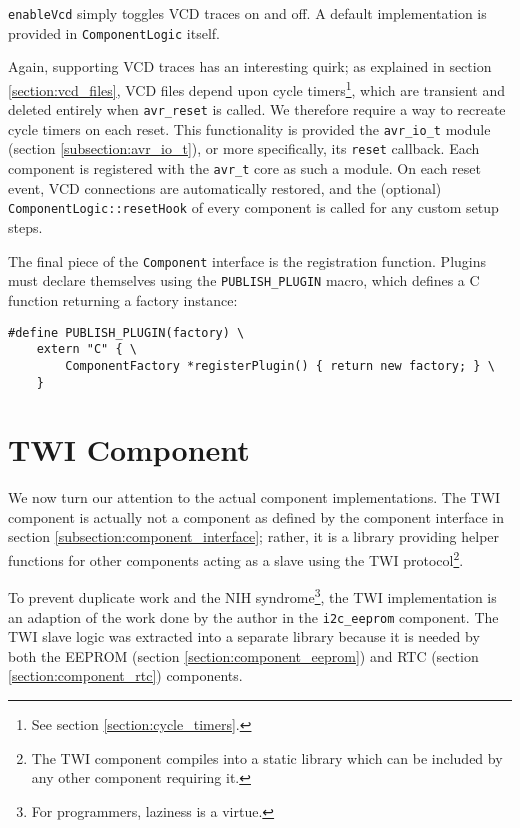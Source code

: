 \lstinline|enableVcd| simply toggles \ac{VCD} traces on and off. A default implementation
is provided in \lstinline|ComponentLogic| itself.

Again, supporting \simavr
\ac{VCD} traces has an interesting quirk; as explained in section \ref{section:vcd_files},
\ac{VCD} files depend upon \simavr cycle timers\footnote{
%
See section \ref{section:cycle_timers}.
%
}, which are transient and deleted entirely when \lstinline|avr_reset| is called.
We therefore require a way to recreate cycle timers on each reset. This functionality
is provided the \lstinline|avr_io_t| module (section \ref{subsection:avr_io_t}),
or more specifically, its \lstinline|reset| callback. Each component is registered
with the \lstinline|avr_t| core as such a module. On each reset event,
\ac{VCD} connections are automatically restored, and the (optional)
\lstinline|ComponentLogic::resetHook| of every component is called for any
custom setup steps.

The final piece of the \lstinline|Component| interface is the registration function.
Plugins must declare themselves using the \lstinline|PUBLISH_PLUGIN| macro,
which defines a C function returning a factory instance:

\begin{lstlisting}
#define PUBLISH_PLUGIN(factory) \
    extern "C" { \
        ComponentFactory *registerPlugin() { return new factory; } \
    }
\end{lstlisting}


\section{\acf{TWI} Component} \label{section:component_twi}

We now turn our attention to the actual component implementations. The \ac{TWI}
component is actually not a component as defined by the component interface in
section \ref{subsection:component_interface}; rather, it is a library providing
helper functions for other components acting as a slave
using the \ac{TWI} protocol\footnote{
%
The \ac{TWI} component compiles into a static library which can be included
by any other component requiring it.
%
}.

To prevent duplicate work and the \ac{NIH} syndrome\footnote{
%
For programmers, laziness is a virtue.
%
}, the \ac{TWI} implementation is an adaption of the work done by the \simavr
author in the \verb|i2c_eeprom| component. The \ac{TWI} slave logic was extracted
into a separate library because it is needed by both the \ac{EEPROM}
(section \ref{section:component_eeprom}) and \ac{RTC} (section \ref{section:component_rtc})
components.

